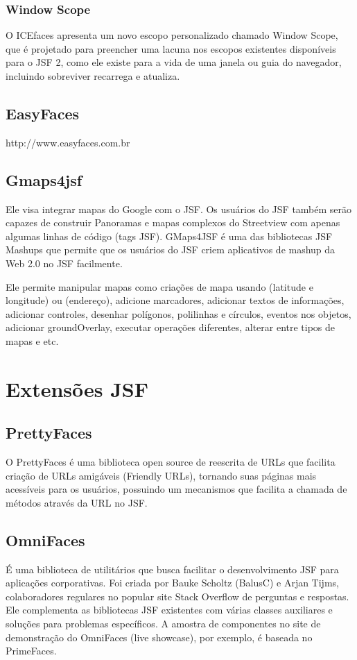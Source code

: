 \documentclass[12pt,a4paper]{article}
\begin{document}
\subsubsection{Window Scope}
O ICEfaces apresenta um novo escopo personalizado chamado Window Scope, que é projetado para preencher uma lacuna nos escopos existentes disponíveis para o JSF 2, como ele existe para a vida de uma janela ou guia do navegador, incluindo sobreviver recarrega e atualiza.

\subsection{EasyFaces}
http://www.easyfaces.com.br 

\subsection{Gmaps4jsf}
Ele visa integrar mapas do Google com o JSF. Os usuários do JSF também serão capazes de construir Panoramas e mapas complexos do Streetview com apenas algumas linhas de código (tags JSF). GMaps4JSF é uma das bibliotecas JSF Mashups que permite que os usuários do JSF criem aplicativos de mashup da Web 2.0 no JSF facilmente.

Ele permite manipular mapas como criações de mapa usando (latitude e longitude) ou (endereço), adicione marcadores, adicionar textos de informações, adicionar controles, desenhar polígonos, polilinhas e círculos, eventos nos objetos, adicionar groundOverlay, executar operações diferentes, alterar entre tipos de mapas e etc.

\section{Extensões JSF}
\subsection{PrettyFaces}
O PrettyFaces é uma biblioteca open source de reescrita de URLs que facilita criação de URLs amigáveis (Friendly URLs), tornando suas páginas mais acessíveis para os usuários, possuindo um mecanismos que facilita a chamada de métodos através da URL no JSF.

\subsection{OmniFaces}
É uma biblioteca de utilitários que busca facilitar o desenvolvimento JSF para aplicações corporativas. Foi criada por Bauke Scholtz (BalusC) e Arjan Tijms, colaboradores regulares no popular site Stack Overflow de perguntas e respostas. Ele complementa as bibliotecas JSF existentes com várias classes auxiliares e soluções para problemas específicos. A amostra de componentes no site de demonstração do OmniFaces (live showcase), por exemplo, é baseada no PrimeFaces. 
\end{document}
